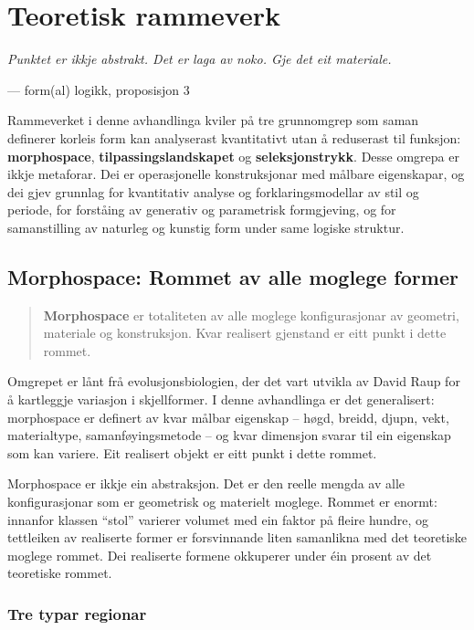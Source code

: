 \documentclass[12pt,a4paper,oneside]{report}
\begin{document}
\chapter{Teoretisk rammeverk}
\label{ch:teori}

\epigraph{\itshape Punktet er ikkje abstrakt. Det er laga av noko. Gje det eit materiale.}{--- form(al) logikk, proposisjon 3}

Rammeverket i denne avhandlinga kviler på tre grunnomgrep som saman definerer korleis form kan analyserast kvantitativt utan å reduserast til funksjon: \textbf{morphospace}, \textbf{tilpassingslandskapet} og \textbf{seleksjonstrykk}. Desse omgrepa er ikkje metaforar. Dei er operasjonelle konstruksjonar med målbare eigenskapar, og dei gjev grunnlag for kvantitativ analyse og forklaringsmodellar av stil og periode, for forståing av generativ og parametrisk formgjeving, og for samanstilling av naturleg og kunstig form under same logiske struktur.

\section{Morphospace: Rommet av alle moglege former}

\begin{quote}
\textbf{Morphospace} er totaliteten av alle moglege konfigurasjonar av geometri, materiale og konstruksjon. Kvar realisert gjenstand er eitt punkt i dette rommet.
\end{quote}

Omgrepet er lånt frå evolusjonsbiologien, der det vart utvikla av David Raup for å kartleggje variasjon i skjellformer. I denne avhandlinga er det generalisert: morphospace er definert av kvar målbar eigenskap -- høgd, breidd, djupn, vekt, materialtype, samanføyingsmetode -- og kvar dimensjon svarar til ein eigenskap som kan variere. Eit realisert objekt er eitt punkt i dette rommet.

Morphospace er ikkje ein abstraksjon. Det er den reelle mengda av alle konfigurasjonar som er geometrisk og materielt moglege. Rommet er enormt: innanfor klassen ``stol'' varierer volumet med ein faktor på fleire hundre, og tettleiken av realiserte former er forsvinnande liten samanlikna med det teoretiske moglege rommet. Dei realiserte formene okkuperer under éin prosent av det teoretiske rommet.

\subsection{Tre typar regionar}
\end{document}
